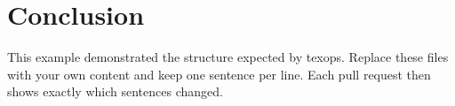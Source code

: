 \section{Conclusion}
\label{sec:conclusion}

This example demonstrated the structure expected by texops.
Replace these files with your own content and keep one sentence per line.
Each pull request then shows exactly which sentences changed.
